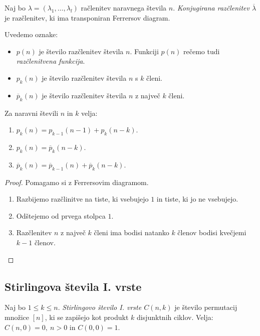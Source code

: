 \begin{definicija}
    Naj bo $\lambda = (\lambda_1, \ldots, \lambda_l)$ račlenitev naravnega števila $n$. \emph{Konjugirana razčlenitev $\overline{\lambda}$} je razčlenitev, ki ima transponiran Ferrersov diagram.
\end{definicija}

Uvedemo oznake:
\begin{itemize}
    \item $p(n)$ je število razčlenitev števila $n$. Funkciji $p(n)$ rečemo tudi \emph{razčlenitvena funkcija}.
    \item $p_k(n)$ je število razčlenitev števila $n$ s $k$ členi.
    \item $\overline{p}_k(n)$ je število razčlenitev števila $n$ z največ $k$ členi.
\end{itemize}

\begin{trditev}
    Za naravni števili $n$ in $k$ velja:
    \begin{enumerate}
        \item $p_k(n) = p_{k-1}(n-1) + p_k(n-k)$.
        \item $p_k(n) = \overline{p}_k(n-k)$.
        \item $\overline{p}_k(n) = \overline{p}_{k-1}(n) + \overline{p}_k(n-k)$.
    \end{enumerate}
\end{trditev}

\begin{proof}
    Pomagamo si z Ferrersovim diagramom.
    \begin{enumerate}
        \item Razbijemo razčlinitve na tiste, ki vsebujejo $1$ in tiste, ki jo ne vsebujejo.
        \item Odštejemo od prvega stolpca $1$.
        \item Razčlenitev $n$ z največ $k$ členi ima bodisi natanko $k$ členov bodisi kvečjemi $k-1$ členov. \qedhere
    \end{enumerate}
\end{proof}

\subsection{Stirlingova števila I. vrste}
\begin{definicija}
    Naj bo $1 \leq k \leq n$. \emph{Stirlingovo število I. vrste $C(n,k)$} je število permutacij množice $[n]$, ki se zapišejo kot produkt $k$ disjunktnih ciklov.
    Velja: $C(n, 0) = 0, \ n > 0$ in $C(0,0) = 1$.
\end{definicija}

